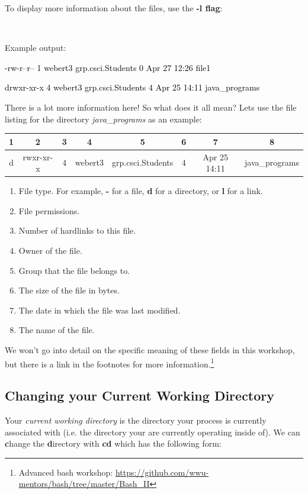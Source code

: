\documentclass[oneside]{book}
\newcommand{\commandline}[1]{\begin{center} \colorbox{Dark}{\textcolor{white}{#1}} \end{center}}
\newcommand{\exampleout}[1]{\begin{center} \colorbox{Light}{\textcolor{black}{#1}} \end{center}}
\begin{document}
To display more information about the files, use the \textbf{-l flag}:

\commandline{ls -l}

Example output:
\exampleout{-rw-r--r-- 1 webert3 grp.csci.Students 0 Apr 27 12:26 file1}
\exampleout{drwxr-xr-x 4 webert3 grp.csci.Students 4 Apr 25 14:11 java\_programs}

There is a lot more information here! So what does it all mean? Lets use the file listing for the directory \textit{java\_programs} as an example:

\begin{center}
    \begin{tabular}{|c|c|c|c|c|c|c|c|}
        \hline
	    1 & 2 & 3 & 4 & 5 & 6 & 7 & 8 \\
	    \hline
        d & rwxr-xr-x & 4 & webert3 & grp.csci.Students & 4 & Apr 25 14:11 & java\_programs\\
        \hline
    \end{tabular}
\end{center}
	
\begin{enumerate}
    \item File type. For example, \textbf{-} for a file, \textbf{d} for a directory, or \textbf{l} for a link.
    \item File permissions. 
    \item Number of hardlinks to this file.
    \item Owner of the file.
    \item Group that the file belongs to.
    \item The size of the file in bytes.
    \item The date in which the file was last modified.
    \item The name of the file.
\end{enumerate}

We won't go into detail on the specific meaning of these fields in this workshop, but there is a link in the footnotes for more information.\footnote{Advanced bash workshop: \url{https://github.com/wwu-mentors/bash/tree/master/Bash_II}}
	
\subsection{Changing your Current Working Directory}
 Your \textit{current working directory} is the directory your process is currently associated with (i.e. the directory your are currently operating inside of). We can \textbf{c}hange the \textbf{d}irectory with \textbf{cd} which has the following form:
\end{document}
